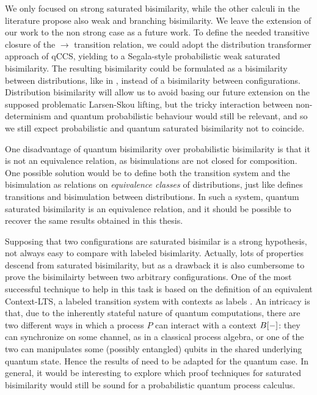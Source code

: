 We only focused on strong saturated bisimilarity, while the other calculi in the literature propose also weak and branching bisimilarity. We leave the extension of our work to the non strong case as a future work. To define the needed transitive closure of the $\rightarrow$ transition relation, we could adopt the distribution transformer approach of qCCS, yielding to a Segala-style probabilistic weak saturated bisimilarity. The resulting bisimilarity could be formulated as a bisimilarity between distributions, like in \cite{hennessyExploringProbabilisticBisimulations2012}, instead of a bisimilarity between configurations. Distribution bisimilarity will allow us to avoid basing our future extension on the supposed
problematic Larsen-Skou lifting, but the tricky interaction between non-determinism and quantum probabilistic behaviour would still be relevant, and so we still expect probabilistic and quantum saturated bisimilarity not to coincide.

One disadvantage of quantum bisimilarity over probabilistic bisimilarity is that it is not an equivalence relation, as bisimulations are not closed for composition. One possible solution would be to define both the transition system and the bisimulation as relations on \textit{equivalence classes} of distributions, just like \cite{hennessyExploringProbabilisticBisimulations2012} defines transitions and bisimulation between distributions. In such a system, quantum saturated bisimilarity is an equivalence relation, and it should be possible to recover the same results obtained in this thesis.

Supposing that two configurations are saturated bisimilar is a strong hypothesis, not always easy to compare with labeled bisimlarity. Actually, lots of properties descend from saturated bisimilarity, but as a drawback it is also cumbersome to prove the bisimilairty between two arbitrary configurations. One of the most successful technique to help in this task is based on the definition of an equivalent Context-LTS, a labeled transition system with contexts as labels \cite{bonchiGeneralTheoryBarbs2014}. An intricacy is that, due to the inherently stateful nature of quantum computations, there are two different ways in which a process $P$ can interact with a context $B[{-}]$: they can synchronize on some channel, as in a classical process algebra, or one of the two can manipulates some (possibly entangled) qubits in the shared  underlying quantum state. Hence the results of \cite{bonchiGeneralTheoryBarbs2014} need to be adapted for the quantum case. In general, it would be interesting to explore which proof techniques for saturated bisimilarity would still be sound for a probabilistic quantum process calculus.
